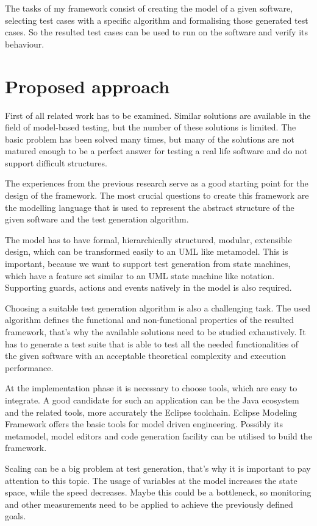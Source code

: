 The tasks of my framework consist of creating the model of a given software, selecting test cases with a specific algorithm and formalising those generated test cases. So the resulted test cases can be used to run on the software and verify its behaviour.


\section*{Proposed approach}
\label{sec:proposedapproach}

First of all related work has to be examined. Similar solutions are available in the field of model-based testing, but the number of these solutions is limited. The basic problem has been solved many times, but many of the solutions are not matured enough to be a perfect answer for testing a real life software and do not support difficult structures.

The experiences from the previous research serve as a good starting point for the design of the framework. The most crucial questions to create this framework are the modelling language that is used to represent the abstract structure of the given software and the test generation algorithm. 

The model has to have formal, hierarchically structured, modular, extensible design, which can be transformed easily to an UML like metamodel. This is important, because we want to support test generation from state machines, which have a feature set similar to an UML state machine like notation. Supporting guards, actions and events natively in the model is also required.

Choosing a suitable test generation algorithm is also a challenging task. The used algorithm defines the functional and non-functional properties of the resulted framework, that's why the available solutions need to be studied exhaustively. It has to generate a test suite that is able to test all the needed functionalities of the given software with an acceptable theoretical complexity and execution performance.

At the implementation phase it is necessary to choose tools, which are easy to integrate. A good candidate for such an application can be the Java ecosystem and the related tools, more accurately the Eclipse toolchain. Eclipse Modeling Framework offers the basic tools for model driven engineering. Possibly its metamodel, model editors and code generation facility can be utilised to build the framework.

Scaling can be a big problem at test generation, that's why it is important to pay attention to this topic. The usage of variables at the model increases the state space, while the speed decreases. Maybe this could be a bottleneck, so monitoring and other measurements need to be applied to achieve the previously defined goals.


